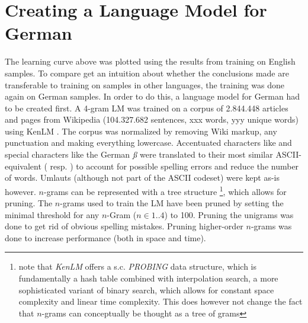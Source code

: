 \section{Creating a Language Model for German}\label{lm}

The learning curve above was plotted using the results from training on English samples. To compare get an intuition about whether the conclusions made are transferable to training on samples in other languages, the training was done again on German samples. In order to do this, a language model for German had to be created first. A 4-gram LM was trained on a corpus of 2.844.448 articles and pages from Wikipedia (104.327.682 sentences, xxx words, yyy unique words) using KenLM \cite{kenlm}. The corpus was normalized by removing Wiki markup, any punctuation and making everything lowercase. Accentuated characters like  and special characters like the German \textit{ß} were translated to their most similar ASCII-equivalent ( resp. ) to account for possible spelling errors and reduce the number of words. Umlauts (although not part of the ASCII codeset) were kept as-is however. $n$-grams can be represented with a tree structure \footnote{note that \textit{KenLM} offers a s.c. \textit{PROBING} data structure, which is fundamentally a hash table combined with interpolation search, a more sophisticated variant of binary search, which allows for constant space complexity and linear time complexity. This does however not change the fact that $n$-grams can conceptually be thought as a tree of grams}, which allows for pruning. The $n$-grams used to train the \ac{LM} have been pruned by setting the minimal threshold for any $n$-Gram ($n \in 1..4$) to 100. Pruning the unigrams was done to get rid of obvious spelling mistakes. Pruning higher-order $n$-grams was done to increase performance (both in space and time).